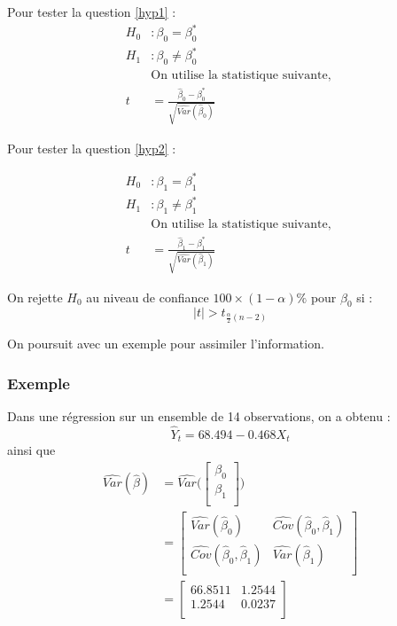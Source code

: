 \documentclass[11pt,french]{report}
\begin{document}
Pour tester la question \ref{hyp1} :
\begin{align*}
H_0 &: \beta_0 = \beta_0^* \\
H_1 &: \beta_0 \neq \beta_0^* \\
&\text{On utilise la statistique suivante, } \\
t &= \frac{\hat{\beta}_0 - \beta_0^* }{\sqrt{\widehat{Var}(\hat{\beta}_0)}}
\end{align*}

Pour tester la question  \ref{hyp2} :

\begin{align*}
H_0 &: \beta_1 = \beta_1^* \\
H_1 &: \beta_1 \neq \beta_1^* \\
&\text{On utilise la statistique suivante, } \\
t &= \frac{\hat{\beta}_1 - \beta_1^* }{\sqrt{\widehat{Var}(\hat{\beta}_1)}}
\end{align*}

On rejette $H_0$ au niveau de confiance $100 \times (1 - \alpha)\%$ pour $\beta_0$ si :
$$
|t| > t_{\frac{\alpha}{2}(n-2)}
$$

\bigskip
On poursuit avec un exemple pour assimiler l'information.

\subsubsection*{Exemple}
Dans une régression sur un ensemble de 14 observations, on a obtenu :
$$
\hat{Y}_t = 68.494 - 0.468X_t
$$
ainsi que 
\begin{align*}
\widehat{Var}(\hat{\beta}) &= \widehat{Var}\Bigg(
\begin{bmatrix}
  \beta_0 \\
  \beta_1 \\ 
\end{bmatrix}\Bigg) \\
&= 
\begin{bmatrix}
  \widehat{Var}(\hat{\beta}_0) & \widehat{Cov}(\hat{\beta}_0, \hat{\beta}_1)\\
  \widehat{Cov}(\hat{\beta}_0, \hat{\beta}_1)  & \widehat{Var}(\hat{\beta}_1)\\ 
\end{bmatrix} \\
&= 
\begin{bmatrix}
  66.8511 & 1.2544\\
  1.2544 & 0.0237\\ 
\end{bmatrix} \\
\end{align*}
\end{document}
